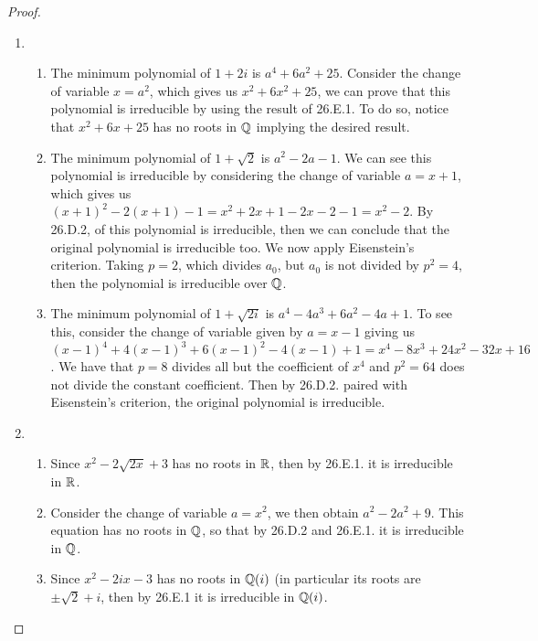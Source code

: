 \begin{proof}
    \begin{enumerate}
    \item 
        \begin{enumerate}
            \item The minimum polynomial of $1+2i$ is $a^4+6a^2+25$. Consider the change of variable $x=a^2$, which gives us $x^2+6x^2+25$, we can prove that this polynomial is irreducible by using the result of 26.E.1. To do so, notice that $x^2+6x+25$ has no roots in $\mathbb{Q}$ implying the desired result.
            \item The minimum polynomial of $1+\sqrt{2}$ is $a^2-2a-1$. We can see this polynomial is irreducible by considering the change of variable $a=x+1$, which gives us $(x+1)^2-2(x+1)-1=x^2+2x+1-2x-2-1=x^2-2$. By 26.D.2, of this polynomial is irreducible, then we can conclude that the original polynomial is irreducible too. We now apply Eisenstein's criterion. Taking $p=2$, which divides $a_0$, but $a_0$ is not divided by $p^2=4$, then the polynomial is irreducible over $\mathbb{Q}$.
            \item The minimum polynomial of $1+\sqrt{2i}$ is $a^4-4a^3+6a^2-4a+1$. To see this, consider the change of variable given by $a=x-1$ giving us $(x-1)^4+4(x-1)^3+6(x-1)^2-4(x-1)+1= x^4-8x^3+24x^2-32x+16$. We have that $p=8$ divides all but the coefficient of $x^4$ and $p^2=64$ does not divide the constant coefficient. Then by 26.D.2. paired with Eisenstein's criterion, the original polynomial is irreducible.
        \end{enumerate}
    \item 
        \begin{enumerate}
            \item Since $x^2-2\sqrt{2x}+3$ has no roots in $\mathbb{R}$, then by 26.E.1. it is irreducible in $\mathbb{R}$.
            \item Consider the change of variable $a=x^2$, we then obtain $a^2-2a^2+9$. This equation has no roots in $\mathbb{Q}$, so that by 26.D.2 and 26.E.1. it is irreducible in $\mathbb{Q}$.
            \item Since $x^2-2ix-3$ has no roots in $\mathbb{Q}(i)$ (in particular its roots are $\pm\sqrt{2}+i$, then by 26.E.1 it is irreducible in $\mathbb{Q}(i)$.
        \end{enumerate}
    \end{enumerate}

\end{proof}

